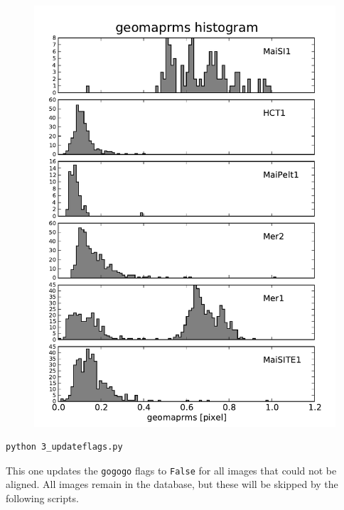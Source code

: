 \begin{figure}[htbp]
\begin{minipage}[c]{0.5\textwidth}
\includegraphics[width=1.0\textwidth]{images/geomaprmshisto.pdf}
\end{minipage} \hfill
\begin{minipage}[c]{.48\textwidth}
\caption{ \label{geomaprmshisto}}
\end{minipage}
\end{figure}


\begin{Verbatim}
python 3_updateflags.py
\end{Verbatim}
This one updates the \verb+gogogo+ flags to \verb+False+ for all images that could not be aligned. All images remain in the database, but these will be skipped by the following scripts.

